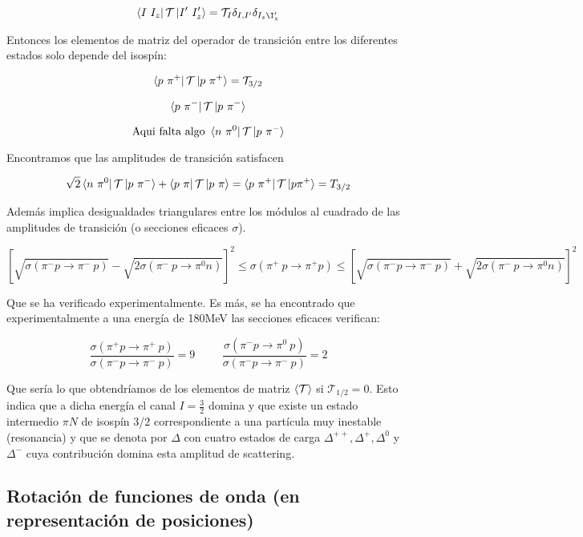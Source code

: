 \documentclass{article}
\begin{document}
        $$\bra{I \ I_z}\mathcal{T}\ket{I' \ I'_z}=\mathcal{T}_I \delta _{I, I'}\delta _{I_z \I_z'}$$

        Entonces los elementos de matriz del operador de transición entre los diferentes estados solo depende del isospín:

        $$\bra{p \ \pi ^+}\mathcal{T}\ket{p \ \pi ^+}=\mathcal{T}_{3/2}$$

        $$\bra{p \ \pi ^-}\mathcal{T}\ket{p \ \pi ^-}$$


        $$\text{Aqui falta algo }\bra{n \ \pi ^0}\mathcal{T}\ket{p \ \pi ^-}$$

        Encontramos que las amplitudes de transición satisfacen

        $$\sqrt{2} \bra{n \ \pi ^0}\mathcal{T}\ket{p \ \pi ^-} + \bra{p \ \pi}\mathcal{T}\ket{p \ \pi}=\bra{p \ \pi ^+} \mathcal{T} \ket{p \pi ^+} = T_{3/2}$$

        Además implica desigualdades triangulares entre los módulos al cuadrado de las amplitudes de transición (o secciones eficaces $\sigma$).

        $$[\sqrt{\sigma (\pi ^-p \to \pi ^- \ p)} - \sqrt{2\sigma (\pi ^- \ p \to \pi ^0 n)}]^2\leq \sigma (\pi ^+ \ p \to \pi ^+ p) \leq [\sqrt{\sigma (\pi ^- p \to \pi ^- \ p)} + \sqrt{2\sigma (\pi ^- \ p \to \pi ^0 n)}]^2$$

        Que se ha verificado experimentalmente. Es más, se ha encontrado que experimentalmente a una energía de 180MeV las secciones eficaces verifican:

        $$\frac{\sigma (\pi ^+ p \to \pi ^+ \ p)}{\sigma (\pi ^-p \to \pi ^- \ p)}=9 \hspace{1cm} \frac{\sigma (\pi ^-p \to \pi ^0 \ p)}{\sigma (\pi ^-p \to \pi ^- \ p)}=2$$

        Que sería lo que obtendríamos de los elementos de matriz $\braket{\mathcal{T}}$ si $\mathcal{T}_{1/2}=0$. Esto indica que a dicha energía el canal $I=\frac{3}{2}$ domina y que existe un estado intermedio $\pi N$ de isospín 3/2 correspondiente a una partícula muy inestable (resonancia) y que se denota por $\Delta$ con cuatro estados de carga $\Delta ^{++}, \Delta ^{+}, \Delta ^{0}$ y $\Delta ^{-}$ cuya contribución domina esta amplitud de scattering.

        \subsection{Rotación de funciones de onda (en representación de posiciones)}
\end{document}

